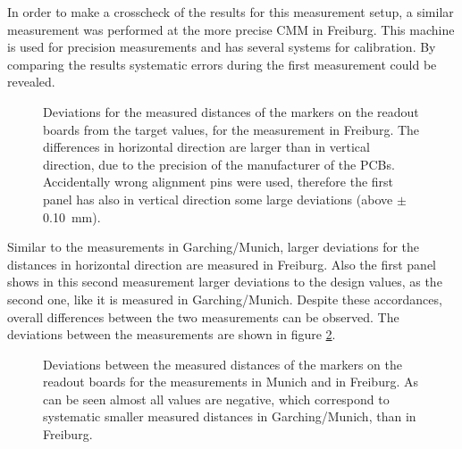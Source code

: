 \documentclass[
a4paper,                                %
twoside,                                %
BCOR1.4cm,                      %
10pt,                           %
headings=normal,                %
headsepline,                    %
clearplainpage, %
final,                                  %
div=14,
parskip=full,
openright,
bibliography=toc
]{scrreprt}
\begin{document}
In order to make a crosscheck of the results for this measurement setup, a similar measurement was performed at the more precise CMM in Freiburg. This machine is used for precision measurements and has several systems for calibration. By comparing the results systematic errors during the first measurement could be revealed.  

\begin{figure}[H]	
	\centering
	\qquad
	\caption{Deviations for the measured distances of the markers on the readout boards from the target values, for the measurement in Freiburg. The differences in horizontal direction are larger than in vertical direction, due to the precision of the manufacturer of the PCBs. Accidentally wrong alignment pins were used, therefore the first panel has also in vertical direction some large deviations (above $\pm$\SI{0.10}{\mm}).}
	\label{panelMeasFreiburg}
\end{figure}

Similar to the measurements in Garching/Munich, larger deviations for the distances in horizontal direction are measured in Freiburg. Also the first panel shows in this second measurement larger deviations to the design values, as the second one, like it is measured in Garching/Munich. Despite these accordances, overall differences between the two measurements can be observed. The deviations between the measurements are shown in figure \ref{diffFreiburgMunich}.

\begin{figure}[H]	
	\centering
	\qquad
	\caption{Deviations between the measured distances of the markers on the readout boards for the measurements in Munich and in Freiburg. As can be seen almost all values are negative, which correspond to systematic smaller measured distances in Garching/Munich, than in Freiburg.}
	\label{diffFreiburgMunich}
\end{figure}
\end{document}
